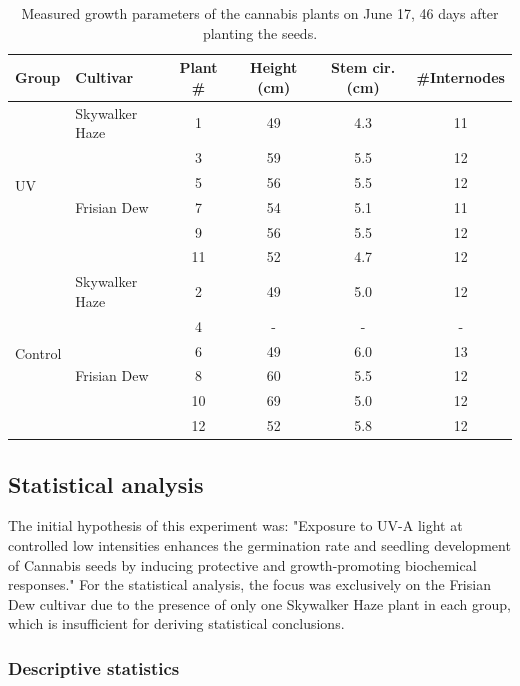 \begin{table}[H]
    \caption[Measured growth parameters of the cannabis plants]{Measured growth parameters of the cannabis plants on June 17, \num[mode=text]{46} days after planting the seeds.}
    \label{tab:measured_growth_parameters}
    \begin{tabularx}{\linewidth}{llcccc}
        \toprule
        \textbf{Group} & \textbf{Cultivar} & \textbf{Plant \#} & \textbf{Height (\unit[mode=text]{\cm})} & \textbf{Stem cir. (\unit[mode=text]{\cm})} & \textbf{\#{}Internodes} \\
        \midrule
        \multirow{6}{*}{UV} & Skywalker Haze & 1 & 49 & 4.3 & 11 \\
        & \multirow[t]{5}{*}{Frisian Dew} & 3 & 59 & 5.5 & 12 \\
        & & 5 & 56 & 5.5 & 12 \\
        & & 7 & 54 & 5.1 & 11 \\
        & & 9 & 56 & 5.5 & 12 \\
        & & 11 & 52 & 4.7 & 12 \\
        \midrule
        \multirow{6}{*}{Control} & Skywalker Haze & 2 & 49 & 5.0 & 12 \\
        & \multirow[t]{5}{*}{Frisian Dew} & 4 & - & - & - \\
        & & 6 & 49 & 6.0 & 13 \\
        & & 8 & 60 & 5.5 & 12 \\
        & & 10 & 69 & 5.0 & 12 \\
        & & 12 & 52 & 5.8 & 12 \\
        \bottomrule
    \end{tabularx}
\end{table}

\subsection{Statistical analysis}

The initial hypothesis of this experiment was: "Exposure to UV-A light at controlled low intensities enhances the germination rate and seedling development of Cannabis seeds by inducing protective and growth-promoting biochemical responses." For the statistical analysis, the focus was exclusively on the Frisian Dew cultivar due to the presence of only one Skywalker Haze plant in each group, which is insufficient for deriving statistical conclusions.

\subsubsection{Descriptive statistics}

